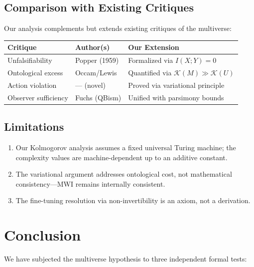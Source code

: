 \documentclass[12pt, a4paper]{article}
\theoremstyle{plain}
\theoremstyle{definition}
\theoremstyle{remark}
\newcommand{\K}{\mathcal{K}}
\begin{document}
\subsection{Comparison with Existing Critiques}

Our analysis complements but extends existing critiques of the multiverse:

\begin{center}
\begin{tabular}{lll}
  \toprule
  \textbf{Critique} & \textbf{Author(s)} & \textbf{Our Extension} \\
  \midrule
  Unfalsifiability & Popper (1959) & Formalized via $I(X;Y)=0$ \\
  Ontological excess & Occam/Lewis & Quantified via $\K(M) \gg \K(U)$ \\
  Action violation & --- (novel) & Proved via variational principle \\
  Observer sufficiency & Fuchs (QBism) & Unified with parsimony bounds \\
  \bottomrule
\end{tabular}
\end{center}

\subsection{Limitations}

\begin{enumerate}
  \item Our Kolmogorov analysis assumes a fixed universal Turing machine;
    the complexity values are machine-dependent up to an additive constant.
  \item The variational argument addresses ontological cost, not
    mathematical consistency---MWI remains internally consistent.
  \item The fine-tuning resolution via non-invertibility is an axiom,
    not a derivation.
\end{enumerate}

\section{Conclusion}\label{sec:conclusion}

We have subjected the multiverse hypothesis to three independent formal
tests:
\end{document}
